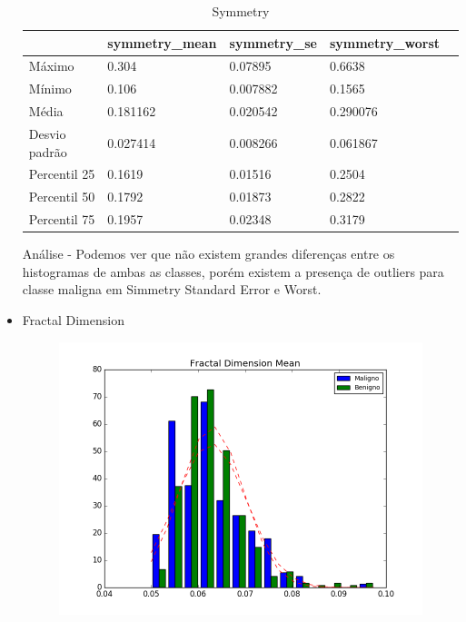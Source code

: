 \documentclass[11pt,a4paper]{article}
\numberwithin{equation}{section}
\begin{document}
\begin{itemize}
\begin{table}[H]
\centering
\caption{Symmetry}
\label{my-label}
\begin{tabular}{lllll} \hline
              & symmetry\_mean & symmetry\_se & symmetry\_worst &  \\ \hline
Máximo        & 0.304          & 0.07895      & 0.6638          &  \\
Mínimo        & 0.106          & 0.007882     & 0.1565          &  \\
Média         & 0.181162       & 0.020542     & 0.290076        &  \\
Desvio padrão & 0.027414       & 0.008266     & 0.061867        &  \\
Percentil 25  & 0.1619         & 0.01516      & 0.2504          &  \\
Percentil 50  & 0.1792         & 0.01873      & 0.2822          &  \\
Percentil 75  & 0.1957         & 0.02348      & 0.3179          &  \\ \hline
\end{tabular}
\end{table}

Análise - Podemos ver que não existem grandes diferenças entre os histogramas de ambas as classes, porém existem a presença de outliers para classe maligna em Simmetry Standard Error e Worst.

\item Fractal Dimension
\begin{figure}[H]
\centering
  \includegraphics[width=.5\linewidth]{../img/hist/fractal_dimension_mean}
  \label{fig:test1}
\end{figure}%


\end{itemize}
\end{document}
